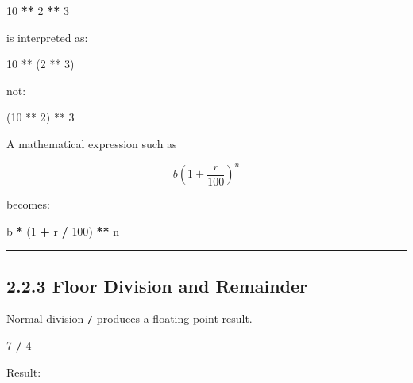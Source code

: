 \documentclass[
]{article}
\newenvironment{Shaded}{\begin{snugshade}}{\end{snugshade}}
\newcommand{\DecValTok}[1]{\textcolor[rgb]{0.00,0.00,0.81}{#1}}
\newcommand{\NormalTok}[1]{#1}
\newcommand{\OperatorTok}[1]{\textcolor[rgb]{0.81,0.36,0.00}{\textbf{#1}}}
\begin{document}
\begin{Shaded}
\begin{Highlighting}[]
\DecValTok{10} \OperatorTok{**} \DecValTok{2} \OperatorTok{**} \DecValTok{3}
\end{Highlighting}
\end{Shaded}

is interpreted as:

\begin{Shaded}
\begin{Highlighting}[]
\NormalTok{10 ** (2 ** 3)}
\end{Highlighting}
\end{Shaded}

not:

\begin{Shaded}
\begin{Highlighting}[]
\NormalTok{(10 ** 2) ** 3}
\end{Highlighting}
\end{Shaded}

A mathematical expression such as

\[
b\left(1 + \frac{r}{100}\right)^n
\]

becomes:

\begin{Shaded}
\begin{Highlighting}[]
\NormalTok{b }\OperatorTok{*}\NormalTok{ (}\DecValTok{1} \OperatorTok{+}\NormalTok{ r }\OperatorTok{/} \DecValTok{100}\NormalTok{) }\OperatorTok{**}\NormalTok{ n}
\end{Highlighting}
\end{Shaded}

\begin{center}\rule{0.5\linewidth}{0.5pt}\end{center}

\subsection{2.2.3 Floor Division and
Remainder}\label{floor-division-and-remainder}

Normal division \texttt{/} produces a floating-point result.

\begin{Shaded}
\begin{Highlighting}[]
\DecValTok{7} \OperatorTok{/} \DecValTok{4}
\end{Highlighting}
\end{Shaded}

Result:
\end{document}
